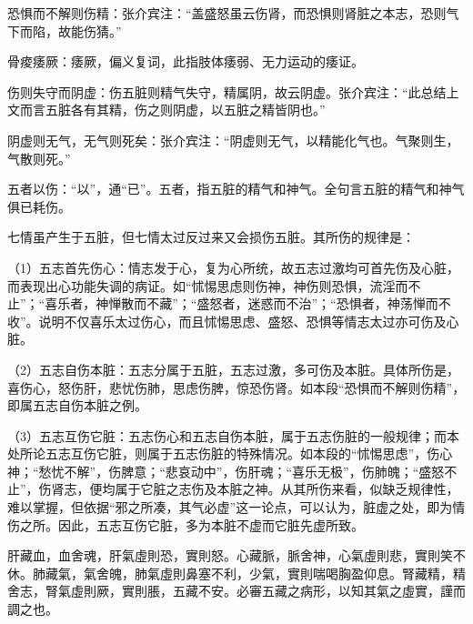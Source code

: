 \documentclass[12pt]{ctexbook}
\begin{document}
\begin{jiaozhu}
  \item 恐惧而不解则伤精：张介宾注：“盖盛怒虽云伤肾，而恐惧则肾脏之本志，恐则气下而陷，故能伤猜。”
  \item 骨痠痿厥：痿厥，偏义复词，此指肢体痿弱、无力运动的痿证。
  \item 伤则失守而阴虚：伤五脏则精气失守，精属阴，故云阴虚。张介宾注：“此总结上文而言五脏各有其精，伤之则阴虚，以五脏之精皆阴也。”
  \item 阴虚则无气，无气则死矣：张介宾注：“阴虚则无气，以精能化气也。气聚则生，气散则死。”
  \item 五者以伤：“以”，通“已”。五者，指五脏的精气和神气。全句言五脏的精气和神气俱已耗伤。
\end{jiaozhu}



七情虽产生于五脏，但七情太过反过来又会损伤五脏。其所伤的规律是：

（1）五志首先伤心：情志发于心，复为心所统，故五志过激均可首先伤及心脏，而表现出心功能失调的病证。如“怵惕思虑则伤神，神伤则恐惧，流淫而不止”；“喜乐者，神惮散而不藏”；“盛怒者，迷惑而不治”；“恐惧者，神荡惮而不收”。说明不仅喜乐太过伤心，而且怵惕思虑、盛怒、恐惧等情志太过亦可伤及心脏。

（2）五志自伤本脏：五志分属于五脏，五志过激，多可伤及本脏。具体所伤是，喜伤心，怒伤肝，悲忧伤肺，思虑伤脾，惊恐伤肾。如本段“恐惧而不解则伤精”，即属五志自伤本脏之例。

（3）五志互伤它脏：五志伤心和五志自伤本脏，属于五志伤脏的一般规律；而本处所论五志互伤它脏，则属于五志伤脏的特殊情况。如本段的“怵惕思虑”，伤心神；“愁忧不解”，伤脾意；“悲哀动中”，伤肝魂；“喜乐无极”，伤肺魄；“盛怒不止”，伤肾志，便均属于它脏之志伤及本脏之神。从其所伤来看，似缺乏规律性，难以掌握，但依据“邪之所凑，其气必虚”这一论点，可以认为，脏虚之处，即为情伤之所。因此，五志互伤它脏，多为本脏不虚而它脏先虚所致。


\begin{yuanwen}
肝藏血，血舍魂，肝氣虛則恐，實則怒。心藏脈，脈舍神，心氣虛則悲，實則笑不休。肺藏氣，氣舍魄，肺氣虛則鼻塞不利，少氣，實則喘喝胸盈仰息。腎藏精，精舍志，腎氣虛則厥，實則脹，五藏不安。必審五藏之病形，以知其氣之虛實，謹而調之也。
\end{yuanwen}

\end{document}

